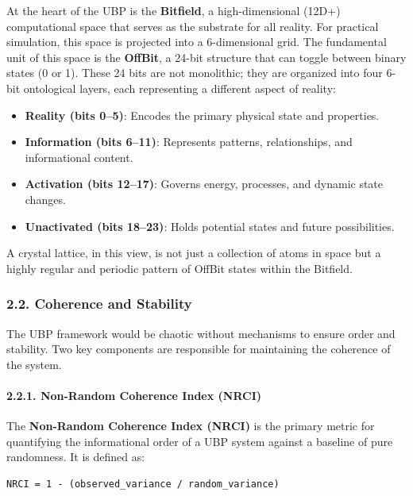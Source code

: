 At the heart of the UBP is the \textbf{Bitfield}, a high-dimensional
(12D+) computational space that serves as the substrate for all reality.
For practical simulation, this space is projected into a 6-dimensional
grid. The fundamental unit of this space is the \textbf{OffBit}, a
24-bit structure that can toggle between binary states (0 or 1). These
24 bits are not monolithic; they are organized into four 6-bit
ontological layers, each representing a different aspect of reality:

\begin{itemize}
\tightlist
\item
  \textbf{Reality (bits 0--5)}: Encodes the primary physical state and
  properties.
\item
  \textbf{Information (bits 6--11)}: Represents patterns, relationships,
  and informational content.
\item
  \textbf{Activation (bits 12--17)}: Governs energy, processes, and
  dynamic state changes.
\item
  \textbf{Unactivated (bits 18--23)}: Holds potential states and future
  possibilities.
\end{itemize}

A crystal lattice, in this view, is not just a collection of atoms in
space but a highly regular and periodic pattern of OffBit states within
the Bitfield.

\subsubsection{2.2. Coherence and
Stability}\label{coherence-and-stability}

The UBP framework would be chaotic without mechanisms to ensure order
and stability. Two key components are responsible for maintaining the
coherence of the system.

\paragraph{2.2.1. Non-Random Coherence Index
(NRCI)}\label{non-random-coherence-index-nrci}

The \textbf{Non-Random Coherence Index (NRCI)} is the primary metric for
quantifying the informational order of a UBP system against a baseline
of pure randomness. It is defined as:

\begin{verbatim}
NRCI = 1 - (observed_variance / random_variance)
\end{verbatim}

